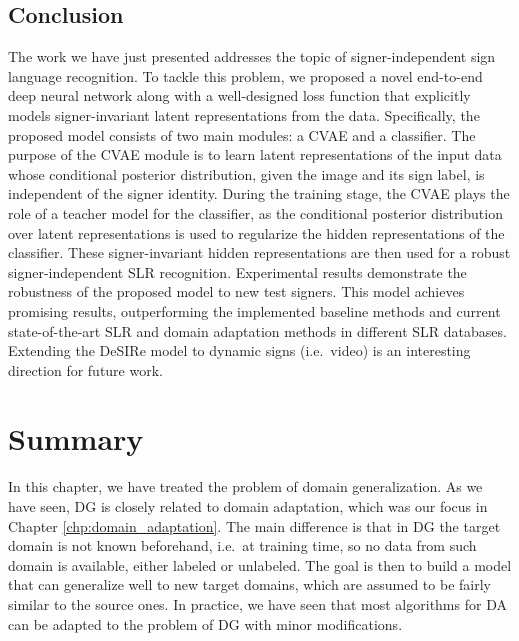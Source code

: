 \subsection{Conclusion}
\label{sec:desire_conclusion}
The work we have just presented addresses the topic of signer-independent sign language recognition. To tackle this problem, we proposed a novel end-to-end deep neural network along with a well-designed loss function that explicitly models signer-invariant latent representations from the data. Specifically, the proposed model consists of two main modules: a CVAE and a classifier. The purpose of the CVAE module is to learn latent representations of the input data whose conditional posterior distribution, given the image and its sign label, is independent of the signer identity. During the training stage, the CVAE plays the role of a teacher model for the classifier, as the conditional posterior distribution over latent representations is used to regularize the hidden representations of the classifier. These signer-invariant hidden representations are then used for a robust signer-independent SLR recognition. Experimental results demonstrate the robustness of the proposed model to new test signers. This model achieves promising results, outperforming the implemented baseline methods and current state-of-the-art SLR and domain adaptation methods in different SLR databases. Extending the DeSIRe model to dynamic signs (i.e.\ video) is an interesting direction for future work.


\section{Summary}
\label{sec:dg_summary}
In this chapter, we have treated the problem of domain generalization. As we have seen, DG is closely related to domain adaptation, which was our focus in Chapter \ref{chp:domain_adaptation}. The main difference is that in DG the target domain is not known beforehand, i.e.\ at training time, so no data from such domain is available, either labeled or unlabeled. The goal is then to build a model that can generalize well to new target domains, which are assumed to be fairly similar to the source ones. In practice, we have seen that most algorithms for DA can be adapted to the problem of DG with minor modifications.

